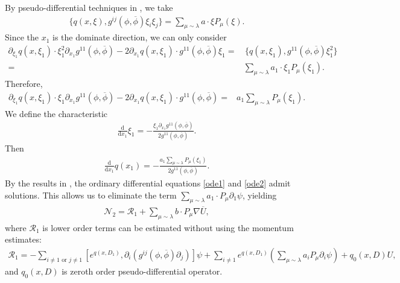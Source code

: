 \documentclass[10pt,twoside,a4paper]{article}
\numberwithin{equation}{section}\allowdisplaybreaks
\begin{document}
By pseudo-differential techniques in \cite{chen2006}, 
we take 
\begin{align*}
	\{q(x,\xi ), g^{ij}\left(\phi,\overline{\phi}\right) \xi_i\xi_j \}=   \sum_{\mu\sim \lambda} a \cdot\xi  P_\mu(\xi ).   
\end{align*}
Since  the $ x_1 $ is the dominate direction, we can only consider 
\begin{align*}
	\partial_{\xi_1 } q(x,\xi_1 )\cdot\xi_1^2 \partial_{x_1}  g^{11}\left(\phi,\overline{\phi}\right) -2  \partial_{x_1 } q(x,\xi_1 )\cdot g^{11}\left(\phi,\overline{\phi}\right)\xi_1
	=&\,\{q(x,\xi_1 ), g^{11}\left(\phi,\overline{\phi}\right) \xi_1^2 \}\\
	= &  \sum_{\mu\sim \lambda} a_1 \cdot\xi_1  P_\mu(\xi_1 ).  
\end{align*}
Therefore,
\begin{align*}
	\partial_{\xi_1 } q(x,\xi_1 )\cdot\xi_1 \partial_{x_1}  g^{11}\left(\phi,\overline{\phi}\right) -2  \partial_{x_1 } q(x,\xi_1 )\cdot g^{11}\left(\phi,\overline{\phi}\right) 
	=&  a_1  \sum_{\mu\sim \lambda}  P_\mu(\xi_1 ).  \end{align*}
We define the characteristic
\begin{align} \label{ode1}
	\frac{\mathrm{d}}{\mathrm{d} x_1} \xi_1 =-\frac{\xi_1 \partial_{x_1}  g^{11}\left(\phi,\overline{\phi}\right) }{2 g^{11}\left(\phi,\overline{\phi}\right) }.
\end{align}
Then 
\begin{align} \label{ode2}
	\frac{\mathrm{d}}{\mathrm{d} x_1} q(x_1)=-\frac{ a_1  \sum_{\mu\sim \lambda}  P_\mu(\xi_1 )   }{2 g^{11}\left(\phi,\overline{\phi}\right) }.
\end{align}
By the results in \cite{ta1985boundary}, the ordinary differential equations \eqref{ode1} and \eqref{ode2} admit solutions. This allows us to eliminate the term  $ \sum_{\mu\sim \lambda} a_1 \cdot P_\mu \partial_1 \psi  $, yielding
\begin{align*}
	\mathcal{N}_2= \mathcal{R}_1+ \sum_{\mu\sim \lambda} b\cdot  P_\mu \nabla \overline{U},
\end{align*}
where $ \mathcal{R}_1 $ is lower order terms can be estimated without using the momentum estimates:
\begin{align*}
	\mathcal{R}_1 =-\sum_{ i\neq 1\text{ or } j\neq 1}	[e^{q (x,D_1)}, \partial_i  (g^{ij}\left(\phi,\overline{\phi}\right) \partial_j)] \psi + \sum_{ i\neq 1} e^{q (x,D_1)} \left(\sum_{\mu\sim \lambda} a_i  P_\mu \partial_i \psi \right) +   q_0(x,D) U,
\end{align*}
and  $ q_0(x,D)  $ is zeroth order pseudo-differential operator. 
\end{document}
